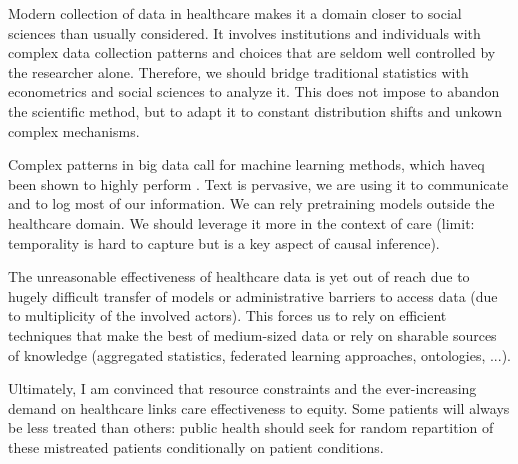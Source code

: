 \documentclass[french,12pt,twoside,a4paper]{book}
\begin{document}
Modern collection of data in healthcare makes it a domain closer to social
sciences than usually considered. It involves institutions and individuals with
complex data collection patterns and choices that are seldom well controlled by
the researcher alone. Therefore, we should bridge traditional
statistics with econometrics and social sciences to analyze it. This does not
impose to abandon the scientific method, but to adapt it to constant
distribution shifts and unkown complex mechanisms.

Complex patterns in big data call for machine learning methods, which haveq been shown to
highly perform . Text is pervasive, we are using it to communicate and to log
most of our information. We can rely pretraining models outside the healthcare
domain. We should leverage it more in the context of care (limit: temporality is
hard to capture but is a key aspect of causal inference).

The unreasonable effectiveness of healthcare data is yet out of reach due to
hugely difficult transfer of models or administrative barriers to access data
(due to multiplicity of the involved actors). This forces us to rely on
efficient techniques that make the best of medium-sized data or rely on sharable
sources of knowledge (aggregated statistics, federated learning approaches,
ontologies, ...).

Ultimately, I am convinced that resource constraints and the ever-increasing
demand on healthcare links care effectiveness to equity. Some patients will
always be less treated than others: public health should seek for random
repartition of these mistreated patients conditionally on patient conditions.


\clearpage
%
%
%
\begin{multicols}{2}
  \printbibliography
\end{multicols}
\end{document}
